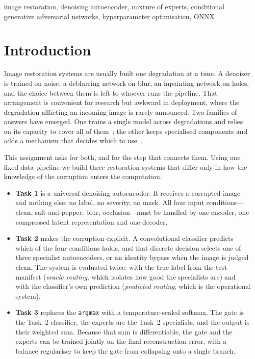 \documentclass[conference]{IEEEtran}
\begin{document}
\begin{IEEEkeywords}
image restoration, denoising autoencoder, mixture of experts, conditional
generative adversarial networks, hyperparameter optimisation, ONNX
\end{IEEEkeywords}

\section{Introduction}

Image restoration systems are usually built one degradation at a time. A
denoiser is trained on noise, a deblurring network on blur, an inpainting
network on holes, and the choice between them is left to whoever runs the
pipeline. That arrangement is convenient for research but awkward in
deployment, where the degradation afflicting an incoming image is rarely
announced. Two families of answers have emerged. One trains a single model
across degradations and relies on its capacity to cover all of
them~\cite{zhang2017beyond,li2022allinone,potlapalli2023promptir}; the other
keeps specialised components and adds a mechanism that decides which to
use~\cite{yu2018crafting,yu2022path}.

This assignment asks for both, and for the step that connects them. Using one
fixed data pipeline we build three restoration systems that differ only in how
the knowledge of the corruption enters the computation.

\begin{itemize}
  \item \textbf{Task 1} is a universal denoising autoencoder. It receives a
  corrupted image and nothing else: no label, no severity, no mask. All four
  input conditions---clean, salt-and-pepper, blur, occlusion---must be handled
  by one encoder, one compressed latent representation and one decoder.
  \item \textbf{Task 2} makes the corruption explicit. A convolutional
  classifier predicts which of the four conditions holds, and that discrete
  decision selects one of three specialist autoencoders, or an identity bypass
  when the image is judged clean. The system is evaluated twice: with the true
  label from the test manifest (\emph{oracle routing}, which isolates how good
  the specialists are) and with the classifier's own prediction
  (\emph{predicted routing}, which is the operational system).
  \item \textbf{Task 3} replaces the \texttt{argmax} with a temperature-scaled
  softmax. The gate is the Task~2 classifier, the experts are the Task~2
  specialists, and the output is their weighted sum. Because that sum is
  differentiable, the gate and the experts can be trained jointly on the final
  reconstruction error, with a balance regulariser to keep the gate from
  collapsing onto a single branch.
\end{itemize}
\end{document}
